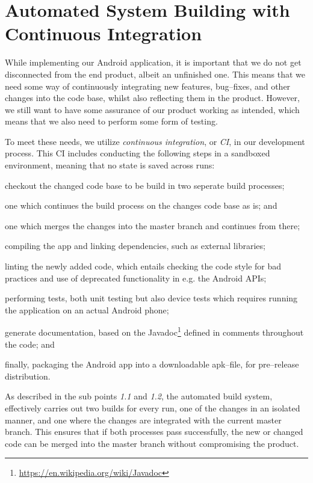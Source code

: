 \section{Automated System Building with Continuous Integration}
While implementing our Android application, it is important that we do not get disconnected from the end product, albeit an unfinished one.
This means that we need some way of continuously integrating new features, bug--fixes, and other changes into the code base, whilst also reflecting them in the product.
However, we still want to have some assurance of our product working as intended, which means that we also need to perform some form of testing.

\bigskip
To meet these needs, we utilize \textit{continuous integration}, or \textit{CI}, in our development process.
This CI includes conducting the following steps in a sandboxed environment, meaning that no state is saved across runs:
\begin{enumberate}
\item checkout the changed code base to be build in two seperate build processes;
\begin{enumberate}
    \item one which continues the build process on the changes code base as is; and
    \item one which merges the changes into the master branch and continues from there;
\end{enumberate}
\item compiling the app and linking dependencies, such as external libraries;
\item linting the newly added code, which entails checking the code style for bad practices and use of deprecated functionality in e.g. the Android APIs;
\item performing tests, both unit testing but also device tests which requires running the application on an actual Android phone;
\item generate documentation, based on the Javadoc\footnote{\url{https://en.wikipedia.org/wiki/Javadoc}} defined in comments throughout the code; and
\item finally, packaging the Android app into a downloadable apk--file, for pre--release distribution.
\end{enumberate}
As described in the sub points \textit{1.1} and \textit{1.2}, the automated build system, effectively carries out two builds for every run, one of the changes in an isolated manner, and one where the changes are integrated with the current master branch.
This ensures that if both processes pass successfully, the new or changed code can be merged into the master branch without compromising the product.

